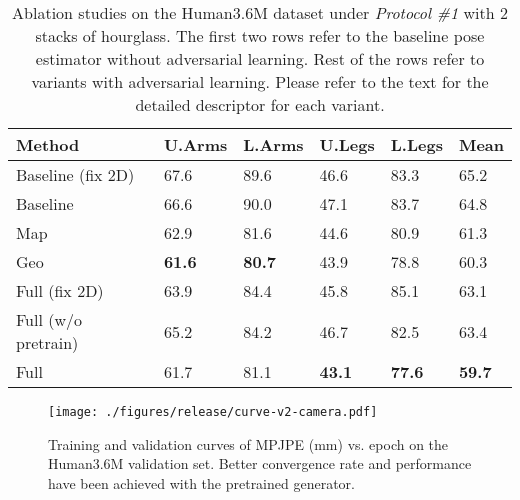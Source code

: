 \documentclass[10pt,twocolumn,letterpaper]{article}
\begin{document}
\begin{table}\begin{footnotesize}
		\centering
		\begin{tabular}{@{}p{2.1cm}p{0.8cm}p{0.8cm}p{0.8cm}p{0.8cm}|p{0.7cm}}
			\hline
			Method 					& U.Arms & L.Arms & U.Legs & L.Legs & Mean	\\
			\hline
			Baseline (fix 2D)		& 67.6 & 89.6 & 46.6 & 83.3 & 65.2 \\
			Baseline 				& 66.6 & 90.0 & 47.1 & 83.7 & 64.8 \\
			\hline
			Map					& 62.9 & 81.6 & 44.6 & 80.9 & 61.3 \\
			Geo				& \textbf{61.6} & \textbf{80.7} & 43.9 & 78.8 & 60.3 \\
			\hline
			Full (fix 2D)		 	& 63.9 & 84.4 & 45.8 & 85.1 & 63.1 \\
			Full (w/o pretrain)	 	& 65.2 & 84.2 & 46.7 & 82.5 & 63.4  \\
			Full					& 61.7 & 81.1 & \textbf{43.1} & \textbf{77.6} & \textbf{59.7} \\
			\hline 
		\end{tabular}
		\vspace{0.2em}
		\caption{Ablation studies on the Human3.6M dataset under \textit{Protocol \#1} with 2 stacks of hourglass. 
			The first two rows refer to the baseline pose estimator without adversarial learning. 
			Rest of the rows refer to variants with adversarial learning. 
			Please refer to the text for the detailed descriptor for each variant. }
		\label{tab:ablation-h36m}
		\vspace{-0.5em}
	\end{footnotesize}
\end{table}














\begin{figure}\begin{center}
		\texttt{[image: ./figures/release/curve-v2-camera.pdf]}
	\end{center}
	\vspace{-1em}
	\caption{Training and validation curves of MPJPE (mm) vs. epoch
		on the Human3.6M validation set. Better convergence rate and performance have been achieved with the pretrained generator.}
	\label{fig:curve}
	\vspace{-1em}
\end{figure}
\end{document}
